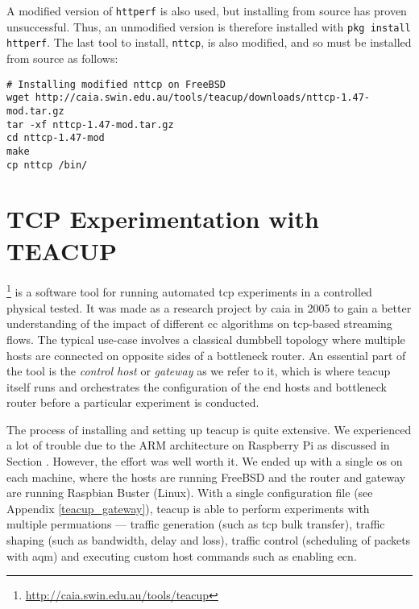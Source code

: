 
A modified version of \lstinline{httperf} is also used, but installing from source has proven unsuccessful. Thus, an unmodified version is therefore installed with \lstinline{pkg install httperf}. The last tool to install, \lstinline{nttcp}, is also modified, and so must be installed from source as follows:

\begin{verbatim}
# Installing modified nttcp on FreeBSD
wget http://caia.swin.edu.au/tools/teacup/downloads/nttcp-1.47-mod.tar.gz
tar -xf nttcp-1.47-mod.tar.gz
cd nttcp-1.47-mod
make
cp nttcp /bin/
\end{verbatim}









\section{TCP Experimentation with TEACUP}

 \footnote{\url{http://caia.swin.edu.au/tools/teacup}} is a software tool for running automated \gls{tcp} experiments in a controlled physical tested. It was made as a research project by \gls{caia} in 2005 to gain a better understanding of the impact of different \gls{cc} algorithms on \gls{tcp}-based streaming flows. \cite{teacup} The typical use-case involves a classical dumbbell topology where multiple hosts are connected on opposite sides of a bottleneck router. An essential part of the tool is the \textit{control host} or \textit{gateway} as we refer to it, which is where \gls{teacup} itself runs and orchestrates the configuration of the end hosts and bottleneck router before a particular experiment is conducted.

The process of installing and setting up \gls{teacup} is quite extensive. We experienced a lot of trouble  due to the ARM architecture on Raspberry Pi as discussed in Section . However, the effort was well worth it. We ended up with a single \gls{os} on each machine, where the hosts are running FreeBSD and the router and gateway are running Raspbian Buster (Linux). With a single configuration file (see Appendix \ref{teacup_gateway}), \gls{teacup} is able to perform experiments with multiple permuations --- traffic generation (such as \gls{tcp} bulk transfer), traffic shaping (such as bandwidth, delay and loss), traffic control (scheduling of packets with \gls{aqm}) and executing custom host commands such as enabling \gls{ecn}.

